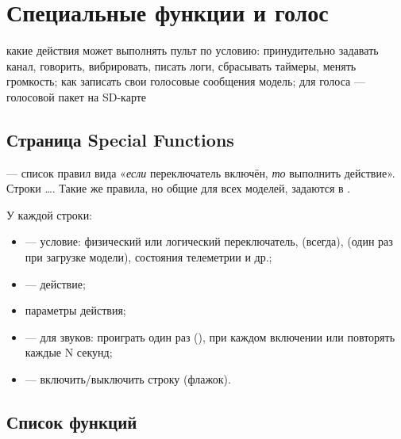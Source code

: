 \chapter{Специальные функции и голос}
\label{ch:special}
\chapterintro
  {какие действия может выполнять пульт по условию: принудительно задавать канал,
   говорить, вибрировать, писать логи, сбрасывать таймеры, менять громкость; как
   записать свои голосовые сообщения}
  {модель; для голоса --- голосовой пакет на SD-карте}

\section{Страница Special Functions}

 --- список правил вида «\emph{если} переключатель включён,
\emph{то} выполнить действие». Строки …. Такие же правила, но общие для всех
моделей, задаются в .

\begin{center}
\end{center}

У каждой строки:
\begin{itemize}
  \item {} --- условие: физический или логический переключатель, 
        (всегда),  (один раз при загрузке модели), состояния телеметрии и др.;
  \item {} --- действие;
  \item параметры действия;
  \item {} --- для звуков: проиграть один раз (), при каждом включении
        или повторять каждые N секунд;
  \item {} --- включить/выключить строку (флажок).
\end{itemize}

\section{Список функций}

